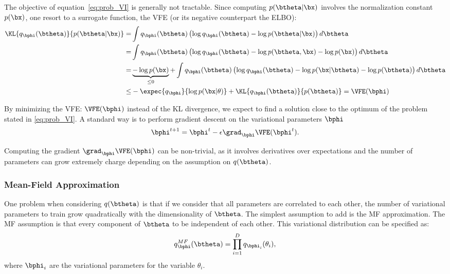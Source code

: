 The objective of equation~\eqref{eq:prob_VI} is generally not tractable.
Since computing $p(\btheta|\bx)$ involves the normalization constant $p(\bx)$, one resort to a surrogate function, the \ac{VFE} (or its negative counterpart the \ac{ELBO}):
\begin{align}
\KL{q_{\bphi}(\btheta)}{p(\btheta|\bx)} =& \int q_{\bphi}(\btheta) \left(\log q_{\bphi}(\btheta) - \log p(\btheta|\bx)\right)d\btheta\\
=&\int q_{\bphi}(\btheta) \left(\log q_{\bphi}(\btheta) - \log p(\btheta, \bx) - \log p(\bx)\right)d\btheta\\
=&\underbrace{- \log p(\bx)}_{\leq 0} + \int q_{\bphi}(\btheta) \left(\log q_{\bphi}(\btheta) - \log p(\bx|\btheta)- \log p(\btheta) \right)d\btheta\\
\leq& -\expec{q_{\bphi}}{\log p(\bx|\theta)} + \KL{q_{\bphi}(\btheta)}{p(\btheta)} = \VFE(\bphi)
\end{align}


By minimizing the \ac{VFE}: $\VFE(\bphi)$ instead of the \ac{KL} divergence, we expect to find a solution close to the optimum of the problem stated in \eqref{eq:prob_VI}.
A standard way is to perform gradient descent on the variational parameters $\bphi$
\begin{align}
\bphi^{t+1} = \bphi^{t} - \epsilon \grad_{\bphi}\VFE(\bphi^{t}).
\label{eq:vigraddescent}
\end{align}

Computing the gradient $\grad_{\bphi}\VFE(\bphi)$ can be non-trivial, as it involves derivatives over expectations and the number of parameters can grow extremely charge depending on the assumption on $q(\btheta)$.

\subsubsection{Mean-Field Approximation}

One problem when considering $q(\btheta)$ is that if we consider that all parameters are correlated to each other, the number of variational parameters to train grow quadratically with the dimensionality of $\btheta$.
The simplest assumption to add is the \ac{MF} approximation.
The \ac{MF} assumption is that every component of $\btheta$ to be independent of each other.
This variational distribution can be specified as:
\begin{align}
q^{MF}_{\bphi}(\btheta) = \prod_{i=1}^D q_{\bphi_i}(\theta_i),
\end{align}
where $\bphi_i$ are the variational parameters for the variable $\theta_i$.


